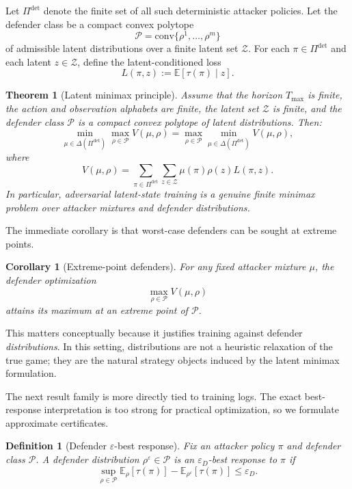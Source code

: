 \documentclass[11pt]{article}
\newtheorem{definition}{Definition}
\newtheorem{theorem}{Theorem}
\newtheorem{corollary}{Corollary}
\newcommand{\Zset}{\mathcal{Z}}
\newcommand{\Pset}{\mathcal{P}}
\newcommand{\E}{\mathbb{E}}
\newcommand{\tauT}{\tau}
\begin{document}
Let $\Pi^{\det}$ denote the finite set of all such deterministic attacker policies. Let the defender class be a compact convex polytope
\[
\Pset=\mathrm{conv}\{\rho^1,\dots,\rho^m\}
\]
of admissible latent distributions over a finite latent set $\Zset$. For each $\pi\in\Pi^{\det}$ and each latent $z\in\Zset$, define the latent-conditioned loss
\[
L(\pi,z):=\E[\tauT(\pi)\mid z].
\]

\begin{theorem}[Latent minimax principle]
Assume that the horizon $T_{\max}$ is finite, the action and observation alphabets are finite, the latent set $\Zset$ is finite, and the defender class $\Pset$ is a compact convex polytope of latent distributions. Then:
\[
\min_{\mu\in\Delta(\Pi^{\det})}\max_{\rho\in\Pset}V(\mu,\rho)
=
\max_{\rho\in\Pset}\min_{\mu\in\Delta(\Pi^{\det})}V(\mu,\rho),
\]
where
\[
V(\mu,\rho)=\sum_{\pi\in\Pi^{\det}}\sum_{z\in\Zset}\mu(\pi)\rho(z)L(\pi,z).
\]
In particular, adversarial latent-state training is a genuine finite minimax problem over attacker mixtures and defender distributions.
\end{theorem}

The immediate corollary is that worst-case defenders can be sought at extreme points.

\begin{corollary}[Extreme-point defenders]
For any fixed attacker mixture $\mu$, the defender optimization
\[
\max_{\rho\in\Pset}V(\mu,\rho)
\]
attains its maximum at an extreme point of $\Pset$.
\end{corollary}

This matters conceptually because it justifies training against defender \emph{distributions}. In this setting, distributions are not a heuristic relaxation of the true game; they are the natural strategy objects induced by the latent minimax formulation.

The next result family is more directly tied to training logs. The exact best-response interpretation is too strong for practical optimization, so we formulate approximate certificates.

\begin{definition}[Defender $\varepsilon$-best response]
Fix an attacker policy $\pi$ and defender class $\Pset$. A defender distribution $\rho^\varepsilon\in\Pset$ is an $\varepsilon_D$-best response to $\pi$ if
\[
\sup_{\rho\in\Pset}\E_{\rho}[\tauT(\pi)]-\E_{\rho^\varepsilon}[\tauT(\pi)]\le \varepsilon_D.
\]
\end{definition}
\end{document}
